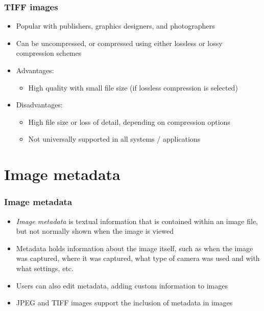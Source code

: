 \documentclass{beamer}
\begin{document}
\begin{frame}
	\frametitle{TIFF images}

	\begin{itemize}

		\item Popular with publishers, graphics designers, and photographers

		\item Can be uncompressed, or compressed using either lossless or lossy compression schemes

		\item Advantages:

		\begin{itemize}

			\item High quality with small file size (if lossless compression is selected)

		\end{itemize}

		\item Disadvantages:

		\begin{itemize}

			\item High file size or loss of detail, depending on compression options

			\item Not universally supported in all systems / applications

		\end{itemize}

	\end{itemize}

\end{frame}

\section{Image metadata}

\begin{frame}

	\frametitle{Image metadata}

	\begin{itemize}

		\item {\em Image metadata} is textual information that is contained within an image file, but not normally shown when the image is viewed

		\item Metadata holds information about the image itself, such as when the image was captured, where it was captured, what type of camera was used and with what settings, etc.

		\item Users can also edit metadata, adding custom information to images

		\item JPEG and TIFF images support the inclusion of metadata in images

	\end{itemize}
\end{frame}
\end{document}

